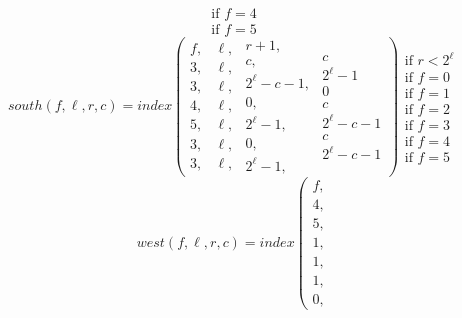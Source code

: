 \documentclass[oneside,10pt]{memoir}
\newcommand{\scmsouth} [1]{\ensuremath{\mathit{south}(#1)}}
\newcommand{\scmwest}  [1]{\ensuremath{\mathit{west}(#1)}}
\begin{document}
\begin{Spacing}{1.1}
\[\begin{array}{l}
  \text{if } f = 4 \\
  \text{if } f = 5
\end{array}\]
%
\[\scmsouth{f,\ell,r,c}=\mathit{index}\left(
\begin{array}{c}
  f, \\ 3, \\ 3, \\ 4, \\ 5, \\ 3, \\ 3,
\end{array}
\begin{array}{c}
  \ell, \\ \ell, \\ \ell, \\ \ell, \\ \ell, \\ \ell, \\ \ell,
\end{array}
\begin{array}{c}
  r+1, \\ c, \\ 2^\ell-c-1, \\ 0, \\ 2^\ell-1, \\ 0, \\ 2^\ell -1,
\end{array}
\begin{array}{c}
  c \\ 2^\ell-1 \\ 0 \\ c \\ 2^\ell-c-1 \\ c \\ 2^\ell-c-1
\end{array}
\right)
\begin{array}{l}
  \text{if } r < 2^\ell \\
  \text{if } f = 0 \\
  \text{if } f = 1 \\
  \text{if } f = 2 \\
  \text{if } f = 3 \\
  \text{if } f = 4 \\
  \text{if } f = 5
\end{array}\]
%
\[\scmwest{f,\ell,r,c}=\mathit{index}\left(
\begin{array}{c}
  f, \\ 4, \\ 5, \\ 1, \\ 1, \\ 1, \\ 0,

\end{array}\]
\end{Spacing}
\end{document}

